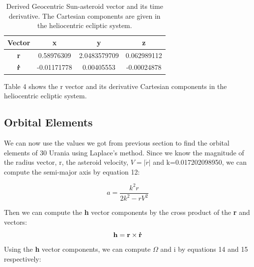 \documentclass[letterpaper,12pt]{article}
\begin{document}
\FloatBarrier
\begin{table}[h!]
\caption{Derived Geocentric Sun-asteroid vector and its time derivative. The Cartesian components are given in the heliocentric ecliptic system.} %
\centering %
\begin{tabular}{| c | c | c | c |} %
\hline %
Vector & x & y & z \\ [0.5ex] %
\hline %
{\bf r}  & 0.58976309  &  2.0483579709 &  0.062989112\\ \hline
\begin{math} {\bf \dot{r}} \end{math} & -0.01171778  &  0.00405553 &  -0.00024878 \\  [1ex] %
\hline %
\end{tabular}
\label{table:nonlin} %
\end{table}
\FloatBarrier

Table 4 shows the r vector and its derivative Cartesian components in the heliocentric ecliptic system.

\subsection{Orbital Elements}
We can now use the values we got from previous section to find the orbital elements of 30 Urania using Laplace's method. Since we know the magnitude of the radius vector, r, the asteroid velocity, \begin{math}V=|\dot{r}| \end{math} and k=0.017202098950, we can compute the semi-major axis by equation 12:

\begin{equation}
a=\frac{k^2r}{2k^2-rV^2}
\end{equation}

Then we can compute the {\bf h} vector components by the cross product of the {\bf r} and {\bf {}} vectors:
\begin{equation}
{\bf h}= {\bf r} \times {\bf \dot{r}}
\end{equation}
Using the {\bf h} vector components, we can compute \begin{math} \Omega \end{math} and i by equations 14 and 15 respectively:
\end{document}
